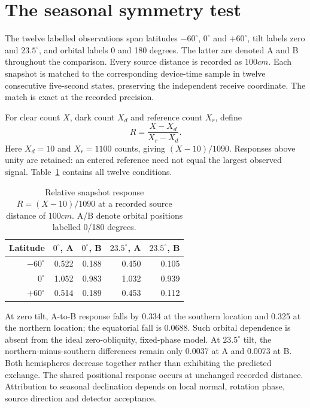 \section{The seasonal symmetry test}
The twelve labelled observations span latitudes $-60^\circ$, $0^\circ$ and $+60^\circ$, tilt labels zero and $23.5^\circ$, and orbital labels 0 and 180 degrees. The latter are denoted A and B throughout the comparison. Every source distance is recorded as $100\unit{cm}$. Each snapshot is matched to the corresponding device-time sample in twelve consecutive five-second states, preserving the independent receive coordinate. The match is exact at the recorded precision.

For clear count $X$, dark count $X_d$ and reference count $X_r$, define
\begin{equation}
 R=\frac{X-X_d}{X_r-X_d}.
 \label{eq:tidal-locking-response}
\end{equation}
Here $X_d=10$ and $X_r=1100$ counts, giving $(X-10)/1090$. Responses above unity are retained: an entered reference need not equal the largest observed signal. Table~\ref{tab:tidal-locking-seasons} contains all twelve conditions.

\begin{table}[t]
\caption{Relative snapshot response $R=(X-10)/1090$ at a recorded source distance of $100\unit{cm}$. A/B denote orbital positions labelled 0/180 degrees.}
\label{tab:tidal-locking-seasons}
\centering\small
\begin{tabular}{@{}rrrrr@{}}
\toprule
Latitude & $0^\circ$, A & $0^\circ$, B & $23.5^\circ$, A & $23.5^\circ$, B\\
\midrule
$-60^\circ$ & 0.522 & 0.188 & 0.450 & 0.105\\
$0^\circ$ & 1.052 & 0.983 & 1.032 & 0.939\\
$+60^\circ$ & 0.514 & 0.189 & 0.453 & 0.112\\
\bottomrule
\end{tabular}
\end{table}

At zero tilt, A-to-B response falls by 0.334 at the southern location and 0.325 at the northern location; the equatorial fall is 0.0688. Such orbital dependence is absent from the ideal zero-obliquity, fixed-phase model. At $23.5^\circ$ tilt, the northern-minus-southern differences remain only 0.0037 at A and 0.0073 at B. Both hemispheres decrease together rather than exhibiting the predicted exchange. The shared positional response occurs at unchanged recorded distance. Attribution to seasonal declination depends on local normal, rotation phase, source direction and detector acceptance.

